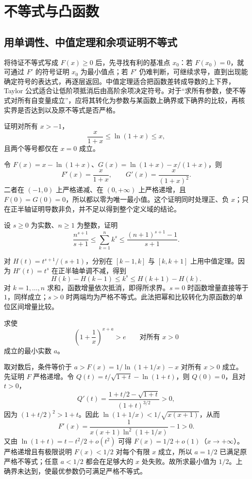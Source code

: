 \section{不等式与凸函数}
\label{sec:pei-diff-convexity}

\subsection{用单调性、中值定理和余项证明不等式}

将待证不等式写成 $F(x)\ge0$ 后，先寻找有利的基准点 $x_0$：若 $F(x_0)=0$，就可通过 $F'$ 的符号证明 $x_0$ 为最小值点；若 $F'$ 仍难判断，可继续求导，直到出现能确定符号的表达式，再逐层返回。中值定理适合把函数差转成导数的上下界，Taylor 公式适合让低阶项抵消后由高阶余项决定符号。对于“求所有参数，使不等式对所有自变量成立”，应将其转化为参数与某函数上确界或下确界的比较，再核实界是否达到以及原不等式是否严格。

\begin{example}
\label{ex:pei-diff-log-inequalities}
证明对所有 $x>-1$，
\[
 \frac{x}{1+x}\le\ln(1+x)\le x,
\]
且两个等号都仅在 $x=0$ 成立。
\end{example}
\begin{solve}
令 $F(x)=x-\ln(1+x)$、$G(x)=\ln(1+x)-x/(1+x)$，则
\[
 F'(x)=\frac{x}{1+x},\qquad G'(x)=\frac{x}{(1+x)^2}.
\]
二者在 $(-1,0)$ 上严格递减、在 $(0,+\infty)$ 上严格递增，且 $F(0)=G(0)=0$，所以都以零为唯一最小值。这个证明同时处理正、负 $x$；只在正半轴证明导数非负，并不足以得到整个定义域的结论。
\end{solve}

\begin{example}
\label{ex:pei-diff-power-sum}
设 $s\ge0$ 为实数、$n\ge1$ 为整数，证明
\[
 \frac{n^{s+1}}{s+1}\le\sum_{k=1}^n k^s
 \le\frac{(n+1)^{s+1}-1}{s+1}.
\]
\end{example}
\begin{solve}
对 $H(t)=t^{s+1}/(s+1)$，分别在 $[k-1,k]$ 与 $[k,k+1]$ 上用中值定理。因为 $H'(t)=t^s$ 在正半轴单调不减，得到
\[
 H(k)-H(k-1)\le k^s\le H(k+1)-H(k).
\]
对 $k=1,\ldots,n$ 求和，函数增量依次抵消，即得所求界。$s=0$ 时函数增量直接等于 $1$，同样成立；$s>0$ 时两端均为严格不等式。此法把幂和比较转化为原函数的单位区间增量比较。
\end{solve}

\begin{example}
\label{ex:pei-diff-best-constant}
求使
\[
 \left(1+\frac1x\right)^{x+a}>e\qquad\text{对所有 }x>0
\]
成立的最小实数 $a$。
\end{example}
\begin{solve}
取对数后，条件等价于
$a>F(x)=1/\ln(1+1/x)-x$ 对所有 $x>0$ 成立。先证明 $F$ 严格递增。令
$Q(t)=t/\sqrt{1+t}-\ln(1+t)$，则 $Q(0)=0$，且对 $t>0$，
\[
 Q'(t)=\frac{1+t/2-\sqrt{1+t}}{(1+t)^{3/2}}>0,
\]
因为 $(1+t/2)^2>1+t$。因此 $\ln(1+1/x)<1/\sqrt{x(x+1)}$，从而
\[
 F'(x)=\frac1{x(x+1)\ln^2(1+1/x)}-1>0.
\]
又由 $\ln(1+t)=t-t^2/2+o(t^2)$ 可得
$F(x)=1/2+o(1)$（$x\to+\infty$）。严格递增且有极限说明 $F(x)<1/2$ 对每个有限 $x$ 成立，所以 $a=1/2$ 已满足原严格不等式；任意 $a<1/2$ 都会在足够大的 $x$ 处失败。故所求最小值为 $1/2$。上确界未达到，使最优参数仍可满足严格不等式。
\end{solve}

